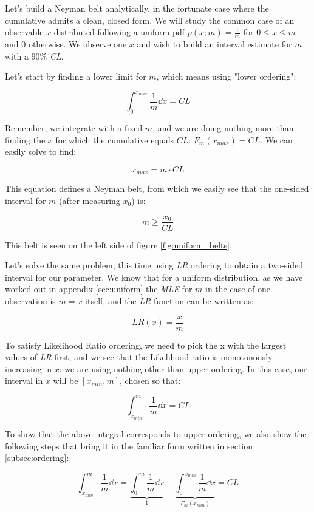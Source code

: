 \begin{example}
	Let's build a Neyman belt analytically, in the fortunate case where the cumulative admits a clean, closed form. We will study the common case of an observable $x$ distributed following a uniform pdf $p(x;m) = \frac{1}{m}$ for $0\leq x \leq m$ and $0$ otherwise. We observe one $x$ and wish to build an interval estimate for $m$ with a $90\%$ \emph{CL}. 
	
	Let's start by finding a lower limit for $m$, which means using "lower ordering":
	
	\[
	\int_0^{x_{max}} \frac{1}{m}\dd x = CL
	\]
	
	Remember, we integrate with a fixed $m$, and we are doing nothing more than finding the $x$ for which the cumulative equals $CL$: $F_{m}(x_{max}) = CL$. We can easily solve to find:
	
	\[
	x_{max} = m\cdot CL
	\]
	
	This equation defines a Neyman belt, from which we easily see that the one-sided interval for $m$ (after measuring $x_0$) is: 
	
	\[
	m\geq \frac{x_0}{CL}
	\]
	
	This belt is seen on the left side of figure \ref{fig:uniform_belts}.
	
	Let's solve the same problem, this time using \emph{LR} ordering to obtain a two-sided interval for our parameter. We know that for a uniform distribution, as we have worked out in appendix \ref{sec:uniform} the \emph{MLE} for $m$ in the case of one observation is $m=x$ itself, and the \emph{LR} function can be written as:
	
	\[
	LR(x) = \frac{x}{m}
	\]
	
	To satisfy Likelihood Ratio ordering, we need to pick the x with the largest values of \emph{LR} first, and we see that the Likelihood ratio is monotonously increasing in $x$: we are using nothing other than upper ordering. In this case, our interval in $x$ will be $[x_{min}, m]$, chosen so that:
	
	\[
	\int_{x_{min}}^m \frac{1}{m}\dd x = CL
	\]
	
	To show that the above integral corresponds to upper ordering, we also show the following steps that bring it in the familiar form written in section \ref{subsec:ordering}:

	\[
	\int_{x_{min}}^m \frac{1}{m}\dd x = \underbrace{\int_0^m \frac{1}{m}\dd x}_{1} - \underbrace{\int_0^{x_{min}} \frac{1}{m}\dd x}_{F_{m}(x_{min})} = CL
	\]
	

\end{example}

